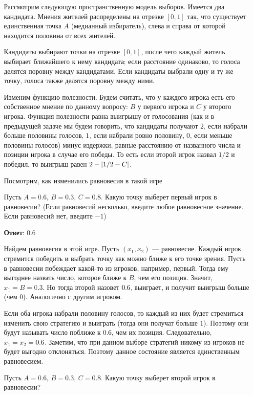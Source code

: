 	\task 
	Рассмотрим следующую пространственную модель выборов. Имеется два кандидата. Мнения жителей распределены на отрезке $[0,1]$ так, что существует единственная точка $A$ (медианный избиратель), слева и справа от которой находится половина от всех жителей.
	
	Кандидаты выбирают точки на отрезке $[0,1]$, после чего каждый житель выбирает ближайшего к нему кандидата; если расстояние одинаково, то голоса делятся поровну между кандидатами. Если кандидаты выбрали одну и ту же точку, голоса также делятся поровну между ними.
	
	Изменим функцию полезности. Будем считать, что у каждого игрока есть его собственное мнение по данному вопросу: $B$ у первого игрока и $C$ у второго игрока. Функция полезности равна выигрышу от голосования (как и в предыдущей задаче мы будем говорить, что кандидаты получают $2$, если набрали больше половины голосов, $1$, если набрали ровно половину, $0$, если меньше половины голосов) минус издержки, равные расстоянию от названного числа и позиции игрока в случае его победы. То есть если второй игрок назвал $1/2$ и победил, то выигрыш равен $2-\left|1/2-C\right|$.
	
	Посмотрим, как изменились равновесия в такой игре
	
	Пусть $A = 0.6,\, B = 0.3,\, C = 0.8$. Какую точку выберет первый игрок в равновесии? (Если равновесий несколько, введите любое равновесное значение. Если равновесий нет, введите $-1$)
	
	\textbf{Ответ}:	0.6
	
	\solution
	\label{week7-models:train:solution-elections}
	Найдем равновесия в этой игре. Пусть $(x_1,x_2)$ --- равновесие. Каждый игрок стремится победить и выбрать точку как можно ближе к его точке зрения. Пусть в равновесии побеждает какой-то из игроков, например, первый. Тогда ему выгоднее назвать число, которое ближе к $B$, чем его позиция. Значит, $x_1=B=0.3$. Но тогда второй назовет $0.6$, выиграет, и получит выигрыш больше (чем $0$). Аналогично с другим игроком.
	
	Если оба игрока набрали половину голосов, то каждый из них будет стремиться изменить свою стратегию и выиграть (тогда они получат больше $1$). Поэтому они будут называть число поближе к $0.6$, чем их позиция. Следовательно, $x_1=x_2=0.6$. Заметим, что при данном выборе стратегий никому из игроков не будет выгодно отклоняться. Поэтому данное состояние является единственным равновесием.
	
	\task Пусть $A = 0.6,\, B = 0.3,\, C = 0.8$. Какую точку выберет второй игрок в равновесии?
	
